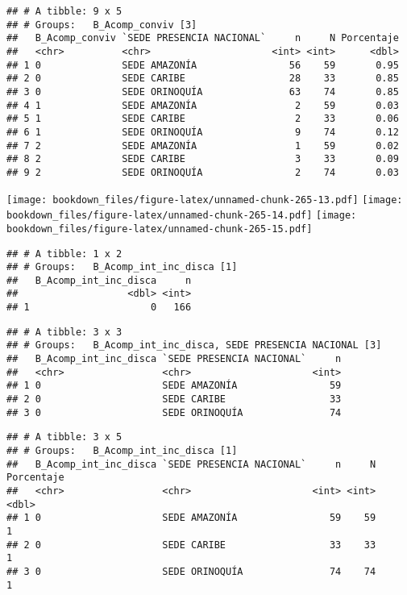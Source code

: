 \documentclass[]{article}
\theoremstyle{definition}
\theoremstyle{definition}
\theoremstyle{definition}
\theoremstyle{remark}
\begin{document}
\begin{verbatim}
## # A tibble: 9 x 5
## # Groups:   B_Acomp_conviv [3]
##   B_Acomp_conviv `SEDE PRESENCIA NACIONAL`     n     N Porcentaje
##   <chr>          <chr>                     <int> <int>      <dbl>
## 1 0              SEDE AMAZONÍA                56    59       0.95
## 2 0              SEDE CARIBE                  28    33       0.85
## 3 0              SEDE ORINOQUÍA               63    74       0.85
## 4 1              SEDE AMAZONÍA                 2    59       0.03
## 5 1              SEDE CARIBE                   2    33       0.06
## 6 1              SEDE ORINOQUÍA                9    74       0.12
## 7 2              SEDE AMAZONÍA                 1    59       0.02
## 8 2              SEDE CARIBE                   3    33       0.09
## 9 2              SEDE ORINOQUÍA                2    74       0.03
\end{verbatim}

\texttt{[image: bookdown\_files/figure-latex/unnamed-chunk-265-13.pdf]}
\texttt{[image: bookdown\_files/figure-latex/unnamed-chunk-265-14.pdf]}
\texttt{[image: bookdown\_files/figure-latex/unnamed-chunk-265-15.pdf]}

\begin{verbatim}
## # A tibble: 1 x 2
## # Groups:   B_Acomp_int_inc_disca [1]
##   B_Acomp_int_inc_disca     n
##                   <dbl> <int>
## 1                     0   166
\end{verbatim}

\begin{verbatim}
## # A tibble: 3 x 3
## # Groups:   B_Acomp_int_inc_disca, SEDE PRESENCIA NACIONAL [3]
##   B_Acomp_int_inc_disca `SEDE PRESENCIA NACIONAL`     n
##   <chr>                 <chr>                     <int>
## 1 0                     SEDE AMAZONÍA                59
## 2 0                     SEDE CARIBE                  33
## 3 0                     SEDE ORINOQUÍA               74
\end{verbatim}

\begin{verbatim}
## # A tibble: 3 x 5
## # Groups:   B_Acomp_int_inc_disca [1]
##   B_Acomp_int_inc_disca `SEDE PRESENCIA NACIONAL`     n     N Porcentaje
##   <chr>                 <chr>                     <int> <int>      <dbl>
## 1 0                     SEDE AMAZONÍA                59    59          1
## 2 0                     SEDE CARIBE                  33    33          1
## 3 0                     SEDE ORINOQUÍA               74    74          1
\end{verbatim}
\end{document}
